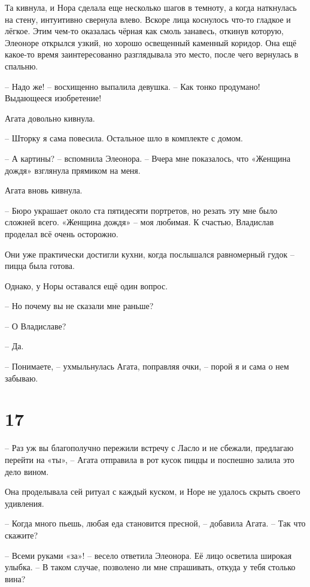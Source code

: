 \documentclass[
  a5paperpaper,
  DIV=11,
  numbers=noendperiod]{scrreprt}
\begin{document}
Та кивнула, и Нора сделала еще несколько шагов в темноту, а когда
наткнулась на стену, интуитивно свернула влево. Вскоре лица коснулось
что-то гладкое и лёгкое. Этим чем-то оказалась чёрная как смоль
занавесь, откинув которую, Элеоноре открылся узкий, но хорошо освещенный
каменный коридор. Она ещё какое-то время заинтересованно разглядывала
это место, после чего вернулась в спальню.

-- Надо же! -- восхищенно выпалила девушка. -- Как тонко продумано!
Выдающееся изобретение!

Агата довольно кивнула.

-- Шторку я сама повесила. Остальное шло в комплекте с домом.

-- А картины? -- вспомнила Элеонора. -- Вчера мне показалось, что
«Женщина дождя» взглянула прямиком на меня.

Агата вновь кивнула.

-- Бюро украшает около ста пятидесяти портретов, но резать эту мне было
сложней всего. «Женщина дождя» -- моя любимая. К счастью, Владислав
проделал всё очень осторожно.

Они уже практически достигли кухни, когда послышался равномерный гудок
-- пицца была готова.

Однако, у Норы оставался ещё один вопрос.

-- Но почему вы не сказали мне раньше?

-- О Владиславе?

-- Да.

-- Понимаете, -- ухмыльнулась Агата, поправляя очки, -- порой я и сама о
нем забываю.

\section*{17}\label{17}


-- Раз уж вы благополучно пережили встречу с Ласло и не сбежали,
предлагаю перейти на «ты», -- Агата отправила в рот кусок пиццы и
поспешно залила это дело вином.

Она проделывала сей ритуал с каждый куском, и Норе не удалось скрыть
своего удивления.

-- Когда много пьешь, любая еда становится пресной, -- добавила Агата.
-- Так что скажите?

-- Всеми руками «за»! -- весело ответила Элеонора. Её лицо осветила
широкая улыбка. -- В таком случае, позволено ли мне спрашивать, откуда у
тебя столько вина?
\end{document}
